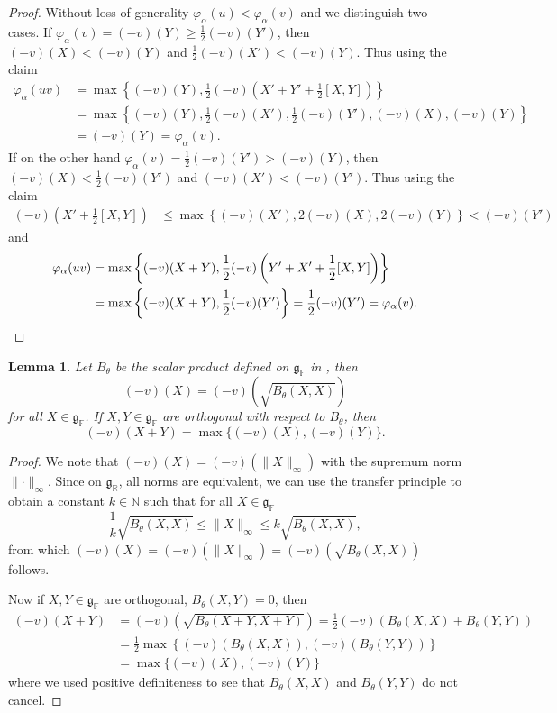 \documentclass[12pt]{amsart}
\newcommand{\F}{\mathbb{F} }
\newcommand{\R}{\mathbb{R} }
\newcommand{\N}{\mathbb{N} }
\newcommand{\frakg}{\mathfrak{g}}
\numberwithin{equation}{section}
\newtheorem{lemma}[theorem]{Lemma}
\theoremstyle{remark} %
\begin{document}
\begin{proof}
	Without loss of generality $\varphi_\alpha(u) < \varphi_\alpha(v)$ and we distinguish two cases. If $\varphi_\alpha(v) = (-v)(Y) \geq \frac{1}{2}(-v)(Y')$, then $(-v)(X) < (-v)(Y)$ and $\frac{1}{2}(-v)(X') < (-v)(Y)$. Thus using the claim
	\begin{align*}
		\varphi_\alpha (uv) & = \max \left\{ (-v)(Y), \frac{1}{2} (-v) \left( X' + Y' + \frac{1}{2}[X,Y] \right)\right\} \\
		&= \max \left\{  (-v)(Y), \frac{1}{2}(-v)(X'), \frac{1}{2}(-v)(Y'), (-v)(X), (-v)(Y) \right\} \\
		&		= (-v)(Y) = \varphi_\alpha(v) .
	\end{align*}
	If on the other hand $\varphi_\alpha(v) = \frac{1}{2}(-v)(Y') > (-v)(Y)$, then $(-v)(X)<\frac{1}{2}(-v)(Y')$ and $(-v)(X') <  (-v)(Y')$. Thus using the claim
	\begin{align*}
		(-v)\left(X' + \frac{1}{2}[X,Y]\right) & \leq \max\left\{ (-v)(X') , 2(-v)(X), 2(-v)(Y) \right\} < (-v)(Y')
	\end{align*}
	and
	\begin{align*}
		\varphi_\alpha(uv) &=\max \left\{ (-v)(X+Y) ,\frac{1}{2}(-v)\left(Y'+ X' + \frac{1}{2}[X,Y]    \right)  \right\} \\
		&= \max \left\{ (-v)(X+Y) , \frac{1}{2} (-v)(Y')  \right\} = \frac{1}{2}(-v)(Y') = \varphi_\alpha(v). \qedhere
	\end{align*}
\end{proof} 

\begin{lemma}\label{lem:orthogonal_valuation}
	Let $B_\theta$ be the scalar product defined on $\frakg_\F$ in \cite[Section \ref{I-sec:killing_involutions_decompositions}]{AppAGRCF}, then
	$$
	(-v)(X) = (-v)\left(\sqrt{B_\theta(X,X)}\right)
	$$
	for all $X \in \frakg_\F$. If $X,Y \in \frakg_\F$ are orthogonal with respect to $B_\theta$, then 
	$$
	(-v)(X+Y) = \max\{ (-v)(X), (-v)(Y) \}.
	$$ 
\end{lemma}
\begin{proof}
	We note that $(-v)(X) = (-v)(\lVert X\rVert_\infty)$ with the supremum norm $\lVert \cdot \rVert_\infty$. Since on $\frakg_\R$, all norms are equivalent, we can use the transfer principle to obtain a constant $k \in \N$ such that for all $X \in \frakg_\F$
	$$
	\frac{1}{k} \sqrt{B_\theta(X,X)} \leq \lVert X \rVert_\infty \leq k \sqrt{B_{\theta}(X,X)},
	$$
	from which $(-v)(X) = (-v)\left(\lVert X\rVert_\infty\right) = (-v)\left(\sqrt{B_\theta(X,X)}\right)$ follows.
	
	Now if $X,Y \in \frakg_\F$ are orthogonal, $B_\theta(X,Y) = 0$, then
	\begin{align*}
		(-v)(X+Y) &= (-v)\left(\sqrt{B_\theta (X+Y, X+Y)} \right)= \frac{1}{2}(-v)\left(B_\theta (X,X)+ B_{\theta}(Y,Y)\right) \\ %
		&= \frac{1}{2}\max\left\{ (-v)(B_{\theta}(X,X)), (-v)(B_{\theta}(Y,Y)) \right\} \\
		& = \max\{(-v)(X), (-v)(Y) \}
	\end{align*}
	where we used positive definiteness to see that $B_\theta(X,X)$ and $B_{\theta}(Y,Y)$ do not cancel.
\end{proof}
\end{document}
